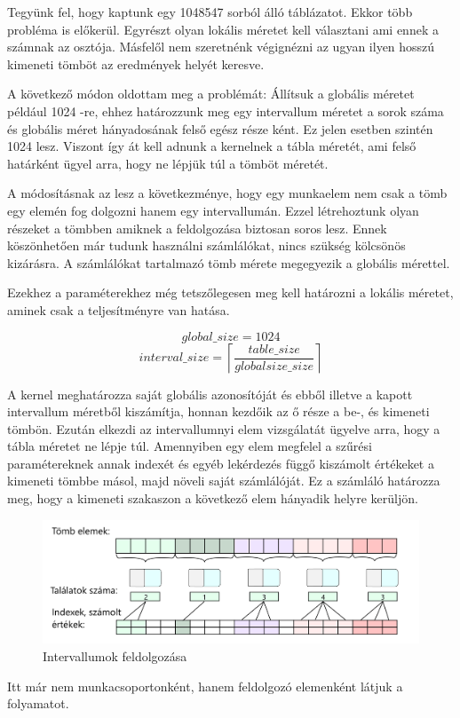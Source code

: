 \newpage

Tegyünk fel, hogy kaptunk egy 1048547 sorból álló táblázatot. Ekkor több probléma is előkerül. Egyrészt olyan lokális méretet kell választani ami ennek a számnak az osztója. Másfelől nem szeretnénk végignézni az ugyan ilyen hosszú kimeneti tömböt az eredmények helyét keresve.

A következő módon oldottam meg a problémát: Állítsuk a globális méretet például 1024 -re, ehhez határozzunk meg egy intervallum méretet a sorok száma és globális méret hányadosának felső egész része ként. Ez jelen esetben szintén 1024 lesz. Viszont így át kell adnunk a kernelnek a tábla méretét, ami felső határként ügyel arra, hogy ne lépjük túl a tömböt méretét.

A módosításnak az lesz a következménye, hogy egy munkaelem nem csak a tömb egy elemén fog dolgozni hanem egy intervallumán. Ezzel létrehoztunk olyan részeket a tömbben amiknek a feldolgozása biztosan soros lesz. Ennek köszönhetően már tudunk használni számlálókat, nincs szükség kölcsönös kizárásra. A számlálókat tartalmazó tömb mérete megegyezik a globális mérettel.

Ezekhez a paraméterekhez még tetszőlegesen meg kell határozni a lokális méretet, aminek csak a teljesítményre van hatása.


$$ global\_size = 1024 $$
$$interval\_size =  \left\lceil \frac{table\_size }{globalsize\_size} \right\rceil  $$



A kernel meghatározza saját globális azonosítóját és ebből illetve a kapott intervallum méretből kiszámítja, honnan kezdőik az ő része a be-, és kimeneti tömbön. Ezután elkezdi az intervallumnyi elem vizsgálatát ügyelve arra, hogy a tábla méretet ne lépje túl. Amennyiben egy elem megfelel a szűrési paramétereknek annak indexét és egyéb lekérdezés függő kiszámolt értékeket a kimeneti tömbbe másol, majd növeli saját számlálóját. Ez a számláló határozza meg, hogy a kimeneti szakaszon a következő elem hányadik helyre kerüljön.
\begin{figure}[h!]
\centering
\includegraphics[width=\textwidth]{images/itemgroup_black.png}
\caption{Intervallumok feldolgozása}
\label{fig:opencl}
\end{figure}
Itt már nem munkacsoportonként, hanem feldolgozó elemenként látjuk a folyamatot.

